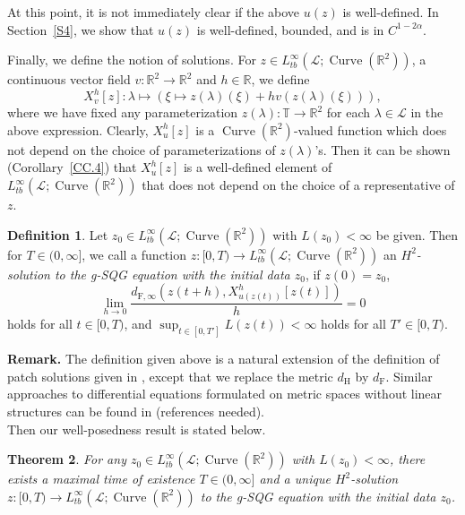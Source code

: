 \documentclass[reqno,centertags,12pt]{amsart}
\newtheorem{theorem}{Theorem}[section]
\theoremstyle{definition}
\newtheorem{definition}[theorem]{Definition}
\numberwithin{equation}{section}
\newcommand{\bbR}{{\mathbb{R}}}
\newcommand{\bbT}{{\mathbb{T}}}
\begin{document}
At this point, it is not immediately clear if the above $u(z)$ is well-defined.
In Section~\ref{S4}, we show that
$u(z)$ is well-defined, bounded, and is in $C^{1-2\alpha}$.

Finally, we define the notion of solutions.
For $z\in L_{tb}^{\infty}(\mathcal{L};\operatorname{Curve}(\bbR^{2}))$,
a continuous vector field $v\colon\bbR^{2}\to\bbR^{2}$ and $h\in\bbR$, we define
\[
    X_{v}^{h}[z]\colon \lambda\mapsto \left(
        \xi\mapsto z(\lambda)(\xi) + hv(z(\lambda)(\xi))
    \right),
\]
where we have fixed any parameterization $z(\lambda)\colon\bbT\to\bbR^{2}$
for each $\lambda\in\mathcal{L}$ in the above expression.
Clearly, $X_{u}^{h}[z]$ is a $\operatorname{Curve}(\bbR^{2})$-valued function
which does not depend on the choice of parameterizations of $z(\lambda)$'s.
Then it can be shown (Corollary~\ref{CC.4})
that $X_{u}^{h}[z]$ is a well-defined element of
$L_{tb}^{\infty}(\mathcal{L};\operatorname{Curve}(\bbR^{2}))$ that does not depend
on the choice of a representative of $z$.

\begin{definition}\label{D2.6}
    Let $z_{0}\in L_{tb}^{\infty}(\mathcal{L};\operatorname{Curve}(\bbR^{2}))$ with
    $L(z_{0}) < \infty$ be given. Then for $T\in(0,\infty]$, we call a function
    $z\colon [0,T)\to L_{tb}^{\infty}(\mathcal{L};\operatorname{Curve}(\bbR^{2}))$
    an \emph{$H^{2}$-solution to the g-SQG equation with the initial data $z_{0}$}, if
    $z(0) = z_{0}$,
    \begin{equation}\label{eq:solution}
        \lim_{h\to 0}\frac{d_{\mathrm{F},\infty}\left(
            z(t+h), X_{u(z(t))}^{h}[z(t)]
        \right)}{h} = 0
    \end{equation}
    holds for all $t\in[0,T)$, and $\sup_{t\in[0,T']}L(z(t)) < \infty$ holds
    for all $T'\in[0,T)$.
\end{definition}

\textbf{Remark.} The definition given above is a natural extension of the definition of
patch solutions given in \cite{KisYaoZla}, except that we replace the metric $d_{\mathrm{H}}$
by $d_{\mathrm{F}}$. Similar approaches to differential equations formulated
on metric spaces without linear structures can be found in (references needed).\\

Then our well-posedness result is stated below.

\begin{theorem}\label{T2.7}
    For any $z_{0}\in L_{tb}^{\infty}(\mathcal{L};\operatorname{Curve}(\bbR^{2}))$ with
    $L(z_{0}) < \infty$, there exists a maximal time of existence $T\in(0,\infty]$
    and a unique $H^{2}$-solution $z\colon[0,T) \to
    L_{tb}^{\infty}(\mathcal{L};\operatorname{Curve}(\bbR^{2}))$ to the g-SQG equation
    with the initial data $z_{0}$.
\end{theorem}
\end{document}
